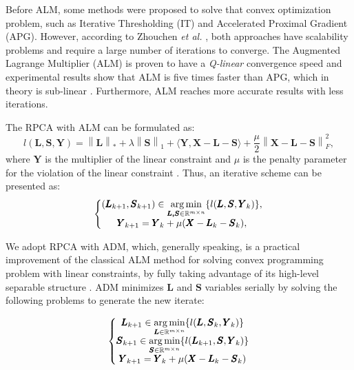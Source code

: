 Before ALM, some methods were proposed to solve that convex optimization problem, such as Iterative Thresholding (IT) and Accelerated Proximal Gradient (APG). However, according to Zhouchen \emph{et al.} \cite{lin2010augmented}, both approaches have scalability problems and require a large number of iterations to converge. The Augmented Lagrange Multiplier (ALM) is proven to have a \emph{Q-linear} convergence speed and experimental results show that ALM is five times faster than APG, which in theory is sub-linear \cite{lin2010augmented}. Furthermore, ALM reaches more accurate results with less iterations.

The RPCA with ALM can be formulated as:
\begin{equation}\label{eq:4.04}
	l(\pmb{L}, \pmb{S}, \pmb{Y}) = \left\|\pmb{L}\right\|_* + \lambda\left\|\pmb{S}\right\|_1 + \langle \pmb{Y}, \pmb{X} - \pmb{L} - \pmb{S}  \rangle + \frac{\mu}{2}\left\|\pmb{X} - \pmb{L} - \pmb{S}\right\|_F^2,
\end{equation}
where $\pmb{Y}$ is the multiplier of the linear constraint and $\mu$ is the penalty parameter for the violation of the linear constraint \cite{yuan2009sparse}. Thus, an iterative scheme can be presented as:
\begin{equation}\label{eq:4.05}
	\left\{
		\begin{matrix} 
			(\pmb{L}_{k+1}, \pmb{S}_{k+1}) \in \operatorname*{arg\,min}\limits_{\pmb{L,S} \in \mathbb{R}^{m \times n}} \{l(\pmb{L}, \pmb{S}, \pmb{Y}_{k})\}, \\ 
			\pmb{Y}_{k+1} = \pmb{Y}_{k} + \mu(\pmb{X} - \pmb{L}_{k} - \pmb{S}_{k}),
		\end{matrix}
	\right.
\end{equation}

We adopt RPCA with ADM, which, generally speaking, is a practical improvement of the classical ALM method for solving convex programming problem with linear constraints, by fully taking advantage of its high-level separable structure \cite{yuan2009sparse}. ADM minimizes $\pmb{L}$ and $\pmb{S}$ variables serially by solving the following problems to generate the new iterate:

\begin{equation}\label{eq:4.06}
	\left\{\begin{matrix}
	\pmb{L}_{k+1} \in \operatorname*{arg\,min}\limits_{\pmb{L} \in \mathbb{R}^{m \times n}}\{l(\pmb{L}, \pmb{S}_{k}, \pmb{Y}_{k})\}\\ 
	\pmb{S}_{k+1} \in \operatorname*{arg\,min}\limits_{\pmb{S} \in \mathbb{R}^{m \times n}}\{l(\pmb{L}_{k+1}, \pmb{S}, \pmb{Y}_{k})\}\\ 
	\pmb{Y}_{k+1} = \pmb{Y}_{k} + \mu(\pmb{X} - \pmb{L}_{k} - \pmb{S}_{k})
	\end{matrix}\right.
\end{equation}

